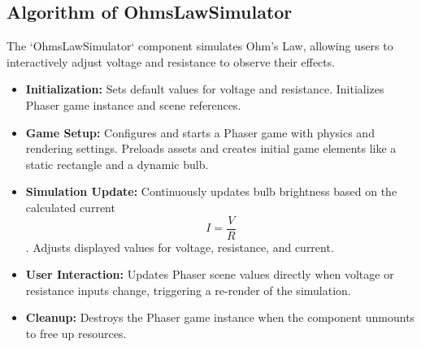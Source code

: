 \subsection{Algorithm of OhmsLawSimulator}
The `OhmsLawSimulator` component simulates Ohm's Law, allowing users to interactively adjust voltage and resistance to observe their effects.
\begin{itemize}
    \item \textbf{Initialization:} Sets default values for voltage and resistance. Initializes Phaser game instance and scene references.
    \item \textbf{Game Setup:} Configures and starts a Phaser game with physics and rendering settings. Preloads assets and creates initial game elements like a static rectangle and a dynamic bulb.
    \item \textbf{Simulation Update:} Continuously updates bulb brightness based on the calculated current \begin{equation}
        I = \frac{V}{R}
        \end{equation}. Adjusts displayed values for voltage, resistance, and current.
    \item \textbf{User Interaction:} Updates Phaser scene values directly when voltage or resistance inputs change, triggering a re-render of the simulation.
    \item \textbf{Cleanup:} Destroys the Phaser game instance when the component unmounts to free up resources.
\end{itemize}
